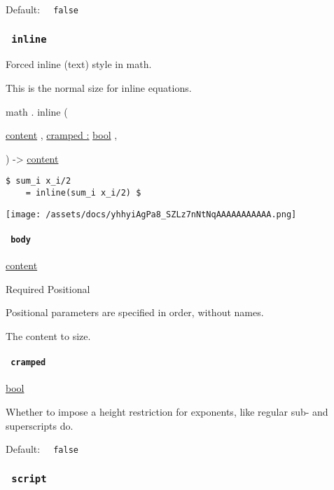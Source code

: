 Default: \texttt{\ }{\texttt{\ false\ }}\texttt{\ }

\subsubsection{\texorpdfstring{\texttt{\ inline\ }}{ inline }}\label{functions-inline}

Forced inline (text) style in math.

This is the normal size for inline equations.

math { . } { inline } (

{ \href{/docs/reference/foundations/content/}{content} , } {
\hyperref[functions-inline-parameters-cramped]{cramped :}
\href{/docs/reference/foundations/bool/}{bool} , }

) -\textgreater{} \href{/docs/reference/foundations/content/}{content}

\begin{verbatim}
$ sum_i x_i/2
    = inline(sum_i x_i/2) $
\end{verbatim}

\texttt{[image: /assets/docs/yhhyiAgPa8\_SZLz7nNtNqAAAAAAAAAAA.png]}

\paragraph{\texorpdfstring{\texttt{\ body\ }}{ body }}\label{functions-inline-body}

\href{/docs/reference/foundations/content/}{content}

{Required} {{ Positional }}

\label{functions-inline-body-positional-tooltip}
Positional parameters are specified in order, without names.

The content to size.

\paragraph{\texorpdfstring{\texttt{\ cramped\ }}{ cramped }}\label{functions-inline-cramped}

\href{/docs/reference/foundations/bool/}{bool}

Whether to impose a height restriction for exponents, like regular sub-
and superscripts do.

Default: \texttt{\ }{\texttt{\ false\ }}\texttt{\ }

\subsubsection{\texorpdfstring{\texttt{\ script\ }}{ script }}\label{functions-script}

